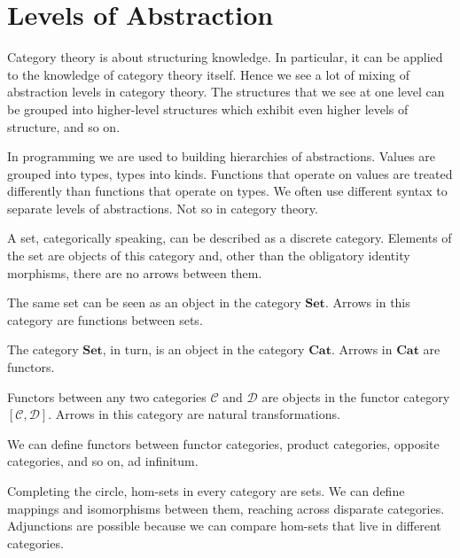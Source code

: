 \documentclass[DaoFP]{subfiles}
\begin{document}
\section{Levels of Abstraction}

Category theory is about structuring knowledge. In particular, it can be applied to the knowledge of category theory itself. Hence we see a lot of mixing of abstraction levels in category theory. The structures that we see at one level can be grouped into higher-level structures which exhibit even higher levels of structure, and so on. 

In programming we are used to building hierarchies of abstractions. Values are grouped into types, types into kinds. Functions that operate on values are treated differently than functions that operate on types. We often use different syntax to separate levels of abstractions. Not so in category theory.

A set, categorically speaking, can be described as a discrete category. Elements of the set are objects of this category and, other than the obligatory identity morphisms, there are no arrows between them. 

The same set can be seen as an object in the category $\mathbf{Set}$. Arrows in this category are functions between sets.

The category $\mathbf{Set}$, in turn, is an object in the category $\mathbf{Cat}$. Arrows in $\mathbf{Cat}$ are functors. 

Functors between any two categories $\mathcal{C}$ and $\mathcal{D}$ are objects in the functor category $[\mathcal{C}, \mathcal{D}]$. Arrows in this category are natural transformations.

We can define functors between functor categories, product categories, opposite categories, and so on, ad infinitum. 

Completing the circle, hom-sets in every category are sets. We can define mappings and isomorphisms between them, reaching across disparate categories. Adjunctions are possible because we can compare hom-sets that live in different categories.
\end{document}
